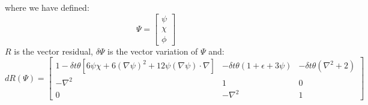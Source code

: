 \documentclass[reqno]{article}
\begin{document}
where we have defined:
\begin{equation}
    \Psi
    =
    \begin{bmatrix}
        \psi \\
        \chi \\
        \phi
    \end{bmatrix}
\end{equation}
$R$ is the vector residual, $\delta \Psi$ is the vector variation of $\Psi$ and:
\begin{equation}
    dR(\Psi)
    =
    \begin{bmatrix}
        1 - \delta t \theta \left[6 \psi \chi + 6 \left(\nabla \psi\right)^2 + 12 \psi \left(\nabla \psi\right) \cdot \nabla \right]
        &-\delta t \theta \left(1 + \epsilon + 3 \psi \right)
        &-\delta t \theta \left(\nabla^2 + 2\right) \\
        -\nabla^2 &1 &0 \\
        0 &-\nabla^2 &1
    \end{bmatrix}
\end{equation}
\end{document}
